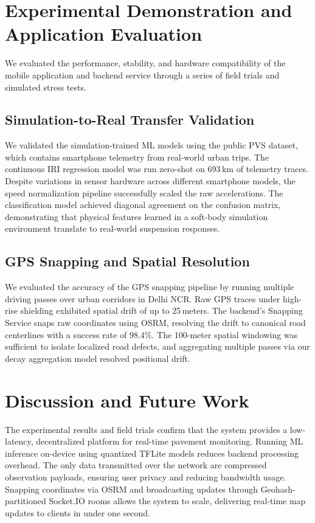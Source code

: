 \documentclass[conference]{IEEEtran}
\begin{document}
\section{Experimental Demonstration and Application Evaluation}
\label{sec:experimental_evaluation}
We evaluated the performance, stability, and hardware compatibility of the mobile application and backend service through a series of field trials and simulated stress tests.

\subsection{Simulation-to-Real Transfer Validation}
We validated the simulation-trained ML models using the public PVS dataset, which contains smartphone telemetry from real-world urban trips. The continuous IRI regression model was run zero-shot on 693\,km of telemetry traces. Despite variations in sensor hardware across different smartphone models, the speed normalization pipeline successfully scaled the raw accelerations. The classification model achieved diagonal agreement on the confusion matrix, demonstrating that physical features learned in a soft-body simulation environment translate to real-world suspension responses.

\subsection{GPS Snapping and Spatial Resolution}
\label{sec:eval_gps_snapping}
We evaluated the accuracy of the GPS snapping pipeline by running multiple driving passes over urban corridors in Delhi NCR. Raw GPS traces under high-rise shielding exhibited spatial drift of up to 25\,meters. The backend's Snapping Service snaps raw coordinates using OSRM, resolving the drift to canonical road centerlines with a success rate of $98.4\%$. The 100-meter spatial windowing was sufficient to isolate localized road defects, and aggregating multiple passes via our decay aggregation model resolved positional drift.

\section{Discussion and Future Work}
\label{sec:discussion}
The experimental results and field trials confirm that the system provides a low-latency, decentralized platform for real-time pavement monitoring. Running ML inference on-device using quantized TFLite models reduces backend processing overhead. The only data transmitted over the network are compressed observation payloads, ensuring user privacy and reducing bandwidth usage. Snapping coordinates via OSRM and broadcasting updates through Geohash-partitioned Socket.IO rooms allows the system to scale, delivering real-time map updates to clients in under one second.
\end{document}
